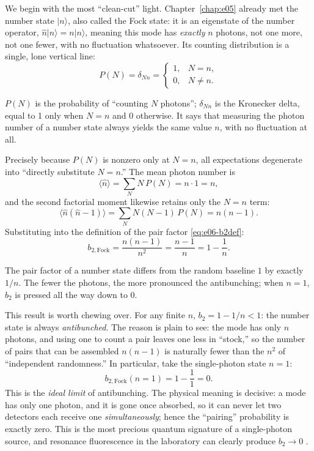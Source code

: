 We begin with the most ``clean-cut'' light. Chapter~\ref{chap:e05} already met the number state \(|n\rangle\), also called the Fock state: it is an eigenstate of the number operator, \(\hat n|n\rangle=n|n\rangle\), meaning this mode has \emph{exactly} \(n\) photons, not one more, not one fewer, with no fluctuation whatsoever. Its counting distribution is a single, lone vertical line:
\begin{equation}
  P(N)=\delta_{Nn}=
  \begin{cases}
    1, & N=n,\\
    0, & N\neq n.
  \end{cases}
  \label{eq:e06-fock-dist}
\end{equation}
\begin{formulaexplain}
\(P(N)\) is the probability of ``counting \(N\) photons''; \(\delta_{Nn}\) is the Kronecker delta, equal to 1 only when \(N=n\) and 0 otherwise. It says that measuring the photon number of a number state always yields the same value \(n\), with no fluctuation at all.
\end{formulaexplain}

Precisely because \(P(N)\) is nonzero only at \(N=n\), all expectations degenerate into ``directly substitute \(N=n\).'' The mean photon number is
\[
  \langle\hat n\rangle=\sum_{N}N\,P(N)=n\cdot 1=n,
\]
and the second factorial moment likewise retains only the \(N=n\) term:
\[
  \langle\hat n(\hat n-1)\rangle=\sum_{N}N(N-1)\,P(N)=n(n-1).
\]
Substituting into the definition of the pair factor \eqref{eq:e06-b2def}:
\begin{equation}
  b_{2,\text{Fock}}=\frac{n(n-1)}{n^{2}}=\frac{n-1}{n}=1-\frac{1}{n}.
  \label{eq:e06-fock-b2}
\end{equation}
\begin{formulaexplain}
The pair factor of a number state differs from the random baseline \(1\) by exactly \(1/n\). The fewer the photons, the more pronounced the antibunching; when \(n=1\), \(b_2\) is pressed all the way down to \(0\).
\end{formulaexplain}

This result is worth chewing over. For any finite \(n\), \(b_2=1-1/n<1\): the number state is always \emph{antibunched}. The reason is plain to see: the mode has only \(n\) photons, and using one to count a pair leaves one less in ``stock,'' so the number of pairs that can be assembled \(n(n-1)\) is naturally fewer than the \(n^2\) of ``independent randomness.'' In particular, take the single-photon state \(n=1\):
\[
  b_{2,\text{Fock}}(n=1)=1-\frac{1}{1}=0.
\]
This is the \emph{ideal limit} of antibunching. The physical meaning is decisive: a mode has only one photon, and it is gone once absorbed, so it can never let two detectors each receive one \emph{simultaneously}; hence the ``pairing'' probability is exactly zero. This is the most precious quantum signature of a single-photon source, and resonance fluorescence in the laboratory can clearly produce \(b_2\to 0\) \citep{1977PhRvL..39..691K}.

